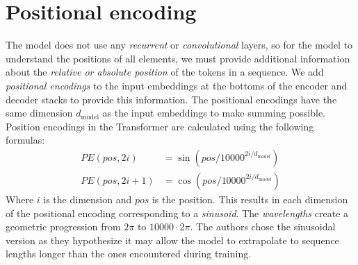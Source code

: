 \section{Positional encoding}\label{sec:positional-encoding}

The model does not use any \textit{recurrent} or \textit{convolutional} layers, so for the model to understand the positions of all elements, we must provide additional information about the \textit{relative or absolute position} of the tokens in a sequence.
We add \textit{positional encodings} to the input embeddings at the bottoms of the encoder and decoder stacks to provide this information.
The positional encodings have the same dimension $d_{\text{model}}$ as the input embeddings to make summing possible.~\cite{attention-is-all-you-need}
Position encodings in the Transformer are calculated using the following formulas:
\begin{align*}
    PE(pos,2i) &= \sin (pos/10000^{2i/d_{\text{model}}}) \\
    PE(pos,2i+1) &= \cos (pos/10000^{2i/d_{\text{model}}})
\end{align*}
Where $i$ is the dimension and $pos$ is the position.
This results in each dimension of the positional encoding corresponding to a \textit{sinusoid}.
The \textit{wavelengths} create a geometric progression from $2\pi$ to $10000 \cdot 2\pi$.
The authors chose the sinusoidal version as they hypothesize it may allow the model to extrapolate to sequence lengths longer than the ones encountered during training.~\cite{attention-is-all-you-need}




